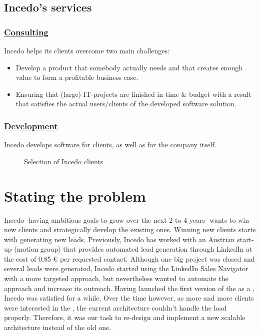 \subsection{Incedo's services}
\subsubsection*{\underline{Consulting}}
Incedo helps its clients overcome two main challenges:
\begin{itemize}
    \item Develop a product that somebody actually needs and that creates enough value to form a profitable business case.
    \item Ensuring that (large) IT-projects are finished in time \& budget with a result that satisfies the actual users/clients of the developed software solution.
\end{itemize}

\subsubsection*{\underline{Development}}
Incedo develops software for clients, as well as for the company itself.
\begin{figure}[H]
    \centering
    \caption{Selection of Incedo clients}
    \label{fig:selection-of-incedo-clients}
\end{figure}

\section{Stating the problem}
Incedo -having ambitious goals to grow over the next 2 to 4 years- wants to win new clients and strategically develop the existing ones. Winning new clients starts with generating new leads. Previously, Incedo has worked with an Austrian start-up (motion group) that provides automated lead generation through LinkedIn at the cost of 0.85 € per requested contact. Although one big project was closed and several leads were generated, Incedo started using the LinkedIn Sales Navigator with a more targeted approach, but nevertheless wanted to automate the approach and increase its outreach.
Having launched the first version of the  as a , Incedo was satisfied for a while.
Over the time however, as more and more clients were interested in the , the current architecture couldn’t handle the load properly. Therefore, it was our task to re-design and implement a new scalable architecture instead of the old one.

